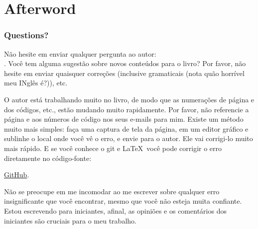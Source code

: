 \part*{Afterword}

\section{Questions?}

Não hesite em enviar qualquer pergunta ao autor: \\
\GTT{<\EMAIL>}.
Você tem alguma sugestão sobre novos conteúdos para o livro?
Por favor, não hesite em enviar quaisquer correções (inclusive gramaticais (nota quão horrível meu INglês é?)), etc.

O autor está trabalhando muito no livro, de modo que as numerações de página e dos códigos, etc., estão mudando muito rapidamente.
Por favor, não referencie a página e aos números de código nos seus e-mails para mim.
Existe um método muito mais simples: faça uma captura de tela da página, em um editor gráfico e sublinhe o local onde você vê o erro, e envie para o autor. Ele vai corrigi-lo muito mais rápido.
E se você conhece o git e \LaTeX\, você pode corrigir o erro diretamente no código-fonte:

\href{http://go.yurichev.com/17089}{GitHub}.

Não se preocupe em me incomodar ao me escrever sobre qualquer erro insignificante que você encontrar, mesmo que você não esteja muita confiante. Estou escrevendo para iniciantes, afinal, as opiniões e os comentários dos iniciantes são cruciais para o meu trabalho.
